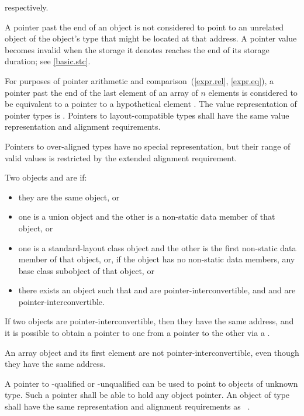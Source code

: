 respectively.
\begin{note}
A pointer past the end of an object
is not considered to point to an unrelated object
of the object's type
that might be located at that address.
A pointer value becomes invalid
when the storage it denotes
reaches the end of its storage duration;
see \ref{basic.stc}.
\end{note}
For purposes of pointer arithmetic
and comparison~(\ref{expr.rel}, \ref{expr.eq}),
a pointer past the end of the last element of
an array  of $n$ elements
is considered to be equivalent to
a pointer to a hypothetical element .
The value representation of
pointer types is . Pointers to
layout-compatible types shall
have the same value representation and alignment
requirements.
\begin{note}
Pointers to over-aligned types have no special
representation, but their range of valid values is restricted by the extended
alignment requirement.
\end{note}

\pnum
Two objects  and  are  if:
\begin{itemize}
\item
they are the same object, or
\item
one is a union object and
the other is a non-static data member of that object, or
\item
one is a standard-layout class object and
the other is the first non-static data member of that object, or,
if the object has no non-static data members,
any base class subobject of that object, or
\item
there exists an object  such that
 and  are pointer-interconvertible, and
 and  are pointer-interconvertible.
\end{itemize}
If two objects are pointer-interconvertible,
then they have the same address,
and it is possible to obtain a pointer to one
from a pointer to the other
via a .
\begin{note}
An array object and its first element are not pointer-interconvertible,
even though they have the same address.
\end{note}

\pnum
{}%
%
A pointer to \cv-qualified or \cv-unqualified
can be used to point to objects of
unknown type. Such a pointer shall be able to hold any object pointer.
An object of type \cv{}~
shall have the same representation and alignment
requirements as \cv{}~.

